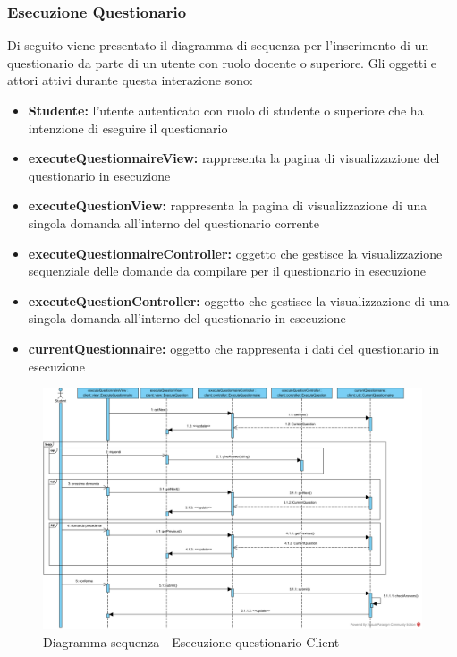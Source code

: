 \documentclass[12pt,a4paper]{article}
\begin{document}
\newpage
\subsubsection{Esecuzione Questionario}
Di seguito viene presentato il diagramma di sequenza per l'inserimento di un questionario da parte di un utente con ruolo docente o superiore. Gli oggetti e attori attivi durante questa interazione sono:

\begin{itemize}
	\item \textbf{Studente:}	 l'utente autenticato con ruolo di studente o superiore che ha intenzione di eseguire il questionario
	\item \textbf{executeQuestionnaireView:} rappresenta la pagina di visualizzazione del questionario in esecuzione
	\item \textbf{executeQuestionView:} rappresenta la pagina di visualizzazione di una singola domanda all'interno del questionario corrente
	\item \textbf{executeQuestionnaireController:} oggetto che gestisce la visualizzazione sequenziale delle domande da compilare per il questionario in esecuzione
	\item \textbf{executeQuestionController:} oggetto che gestisce la visualizzazione di una singola domanda all'interno del questionario in esecuzione
	\item \textbf{currentQuestionnaire:} oggetto che rappresenta i dati del questionario in esecuzione
\end{itemize}

\begin{center}
	\begin{figure}[H]
		\centering \includegraphics[max width=\myheight, angle=90]{../img/diagrammiSequenza/executeQuestionnaireClient.png}
		\caption{Diagramma sequenza - Esecuzione questionario Client}
	\end{figure}
\end{center}
\end{document}
